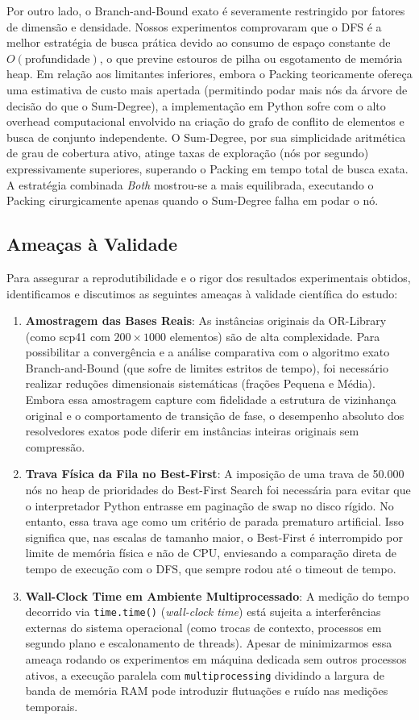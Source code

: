 \documentclass[conference]{IEEEtran}
\begin{document}
Por outro lado, o Branch-and-Bound exato é severamente restringido por fatores de dimensão e densidade. Nossos experimentos comprovaram que o DFS é a melhor estratégia de busca prática devido ao consumo de espaço constante de $O(\text{profundidade})$, o que previne estouros de pilha ou esgotamento de memória heap. Em relação aos limitantes inferiores, embora o Packing teoricamente ofereça uma estimativa de custo mais apertada (permitindo podar mais nós da árvore de decisão do que o Sum-Degree), a implementação em Python sofre com o alto overhead computacional envolvido na criação do grafo de conflito de elementos e busca de conjunto independente. O Sum-Degree, por sua simplicidade aritmética de grau de cobertura ativo, atinge taxas de exploração (nós por segundo) expressivamente superiores, superando o Packing em tempo total de busca exata. A estratégia combinada \textit{Both} mostrou-se a mais equilibrada, executando o Packing cirurgicamente apenas quando o Sum-Degree falha em podar o nó.

\subsection{Ameaças à Validade}
Para assegurar a reprodutibilidade e o rigor dos resultados experimentais obtidos, identificamos e discutimos as seguintes ameaças à validade científica do estudo:
\begin{enumerate}
\item \textbf{Amostragem das Bases Reais}: As instâncias originais da OR-Library (como scp41 com $200 \times 1000$ elementos) são de alta complexidade. Para possibilitar a convergência e a análise comparativa com o algoritmo exato Branch-and-Bound (que sofre de limites estritos de tempo), foi necessário realizar reduções dimensionais sistemáticas (frações Pequena e Média). Embora essa amostragem capture com fidelidade a estrutura de vizinhança original e o comportamento de transição de fase, o desempenho absoluto dos resolvedores exatos pode diferir em instâncias inteiras originais sem compressão.
\item \textbf{Trava Física da Fila no Best-First}: A imposição de uma trava de 50.000 nós no heap de prioridades do Best-First Search foi necessária para evitar que o interpretador Python entrasse em paginação de swap no disco rígido. No entanto, essa trava age como um critério de parada prematuro artificial. Isso significa que, nas escalas de tamanho maior, o Best-First é interrompido por limite de memória física e não de CPU, enviesando a comparação direta de tempo de execução com o DFS, que sempre rodou até o timeout de tempo.
\item \textbf{Wall-Clock Time em Ambiente Multiprocessado}: A medição do tempo decorrido via \texttt{time.time()} (\textit{wall-clock time}) está sujeita a interferências externas do sistema operacional (como trocas de contexto, processos em segundo plano e escalonamento de threads). Apesar de minimizarmos essa ameaça rodando os experimentos em máquina dedicada sem outros processos ativos, a execução paralela com \texttt{multiprocessing} dividindo a largura de banda de memória RAM pode introduzir flutuações e ruído nas medições temporais.
\end{enumerate}
\end{document}
